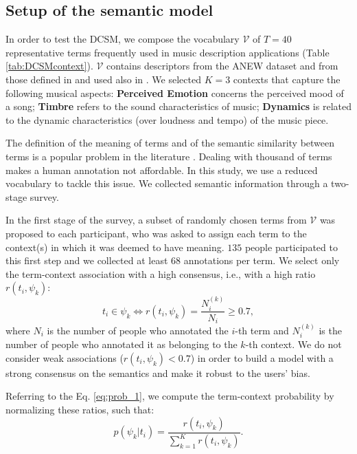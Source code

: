 \subsection{Setup of the semantic model}
\label{sem_survey}
In order to test the DCSM, we compose the vocabulary $\mathcal{V}$ of $T=40$ representative terms frequently used in music description applications (Table \ref{tab:DCSMcontext}). $\mathcal{V}$ contains descriptors from the ANEW dataset \cite{Bradley1999} and from those defined in  \cite{lesaffre2008} and used also in \cite{Buccoli2013}. We selected $K=3$ contexts that capture the following musical aspects: \textbf{Perceived Emotion} concerns the perceived mood of a song; \textbf{Timbre} refers to the sound characteristics of music; \textbf{Dynamics} is related to the dynamic characteristics (over loudness and tempo) of the music piece.

The definition of the meaning of terms and of the semantic similarity between terms is a popular problem in the literature \cite{Deerwester1990}. Dealing with thousand of terms makes a human annotation not affordable. In this study, we use a reduced vocabulary to tackle this issue. We collected semantic information through a two-stage survey.

In the first stage of the survey, a subset of randomly chosen terms from $\mathcal{V}$ was proposed to each participant, who was asked to assign each term to the context(s) in which it was deemed to have meaning. $135$ people participated to this first step and we collected at least $68$ annotations per term. We select only the term-context association with a high consensus, i.e., with a high ratio $r(t_i, \psi_k)$:
 \begin{equation}
t_i \in \psi_k \Longleftrightarrow   r(t_i, \psi_k) = \frac{N_{i}^{(k)}}{N_{i}}\geq 0.7,
 \end{equation}
where $N_i$ is the number of people who annotated the $i$-th term and $N_i^{(k)}$ is the number of people who annotated it as belonging to the $k$-th context. We do not consider weak associations ($r(t_i,\psi_k)<0.7$) in order to build a model with a strong consensus on the semantics and make it robust to the users' bias.

Referring to the Eq. \ref{eq:prob_1}, we compute the term-context probability by normalizing these ratios, such that:
 \begin{equation}
 p(\psi_k | t_i) =  \frac{r(t_i, \psi_k)}{\sum_{k=1}^K r(t_i, \psi_k)}.
 \label{eq:prob_3}
 \end{equation}  

